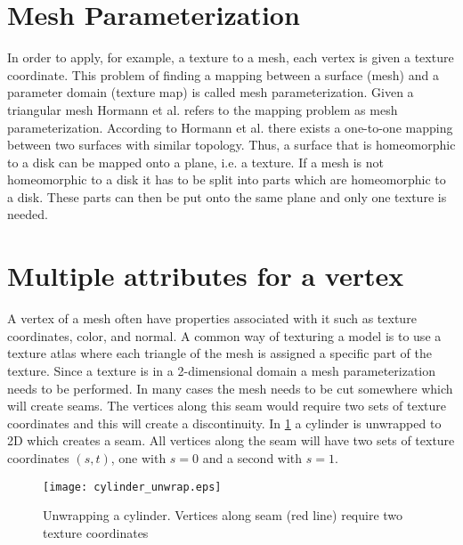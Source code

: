 \section{Mesh Parameterization} \label{sec:mesh_parameterization}
In order to apply, for example, a texture to a mesh, each vertex is given a texture coordinate. This problem of finding a mapping between a surface (mesh) and a parameter domain (texture map) is called mesh parameterization. Given a triangular mesh Hormann et al. \cite{hormann2007mesh} refers to the mapping problem as mesh parameterization. According to Hormann et al. there exists a one-to-one mapping between two surfaces with similar topology. Thus, a surface that is homeomorphic to a disk can be mapped onto a plane, i.e. a texture. If a mesh is not homeomorphic to a disk it has to be split into parts which are homeomorphic to a disk. These parts can then be put onto the same plane and only one texture is needed.

\section{Multiple attributes for a vertex} \label{sec:vertex_with_multi_attributes}
A vertex of a mesh often have properties associated with it such as texture coordinates, color, and normal. A common way of texturing a model is to use a texture atlas where each triangle of the mesh is assigned a specific part of the texture. Since a texture is in a 2-dimensional domain a mesh parameterization needs to be performed. In many cases the mesh needs to be cut somewhere which will create seams. The vertices along this seam would require two sets of texture coordinates and this will create a discontinuity. In \cref{fig:cylinder_unwrap} a cylinder is unwrapped to 2D which creates a seam. All vertices along the seam will have two sets of texture coordinates $(s,t)$, one with $s=0$ and a second with $s=1$.


\begin{figure}[ht]
    \centering
    \texttt{[image: cylinder\_unwrap.eps]}
    \caption[Unwrapping a cylinder]{Unwrapping a cylinder. Vertices along seam (red line) require two texture coordinates}
    \label{fig:cylinder_unwrap}
\end{figure}


